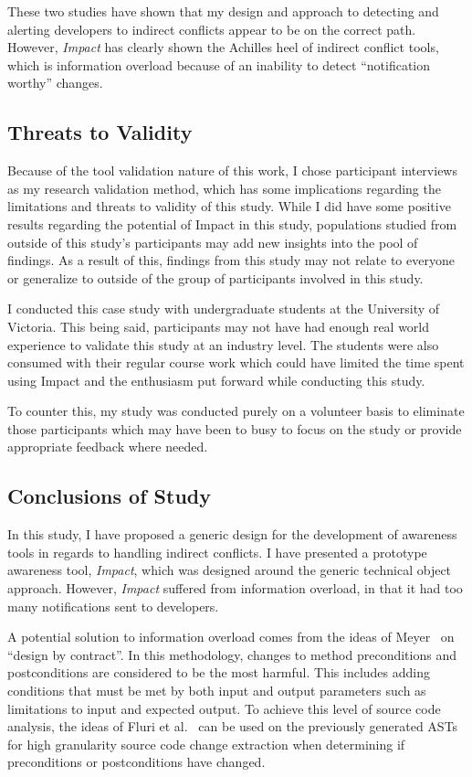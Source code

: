 These two studies have shown that my design and approach to
detecting and alerting developers to indirect conflicts appear
to be on the correct path. However, \textit{Impact} has clearly shown
the Achilles heel of indirect conflict tools, which is information
overload because of an inability to detect ``notification worthy''
changes.

\subsection{Threats to Validity}
Because of the tool validation nature of this work, I chose participant interviews as my research validation method, which has some implications regarding the
limitations and threats to validity of this study. While I did have some positive results regarding the potential of Impact in this study,
populations studied from outside of this study's participants may add new insights into the pool of findings. As a result of this, findings
from this study may not relate to everyone or generalize to outside of the group of participants involved in this study.

I conducted this case study with undergraduate students at the University of Victoria. This being said, participants
may not have had enough real world experience to validate this study at an industry level. The students were also consumed with their regular course
work which could have limited the time spent using Impact and the enthusiasm put forward while conducting this study.

To counter this, my study was conducted purely on a volunteer basis to eliminate those participants which may have been to busy to focus
on the study or provide appropriate feedback where needed.

\subsection{Conclusions of Study}
\label{sec:ns}
In this study, I have proposed a generic 
design for the development of awareness tools in regards to
handling indirect conflicts. I have presented a prototype 
awareness tool, \textit{Impact}, which was designed around the generic 
technical object approach. However, \textit{Impact} suffered from
information overload, in that it had too many notifications sent to
developers.

A potential solution to information overload comes from the ideas of
Meyer~\cite{Meyer:1988} on ``design by contract''. In this methodology, changes to method
preconditions and postconditions are considered to be the most harmful. 
This includes adding conditions that must be met by both input
and output parameters such as limitations to input and expected
output. To achieve this level of source code analysis, the ideas of
Fluri et al.~\cite{Fluri:2007:CDT} can be used on the previously generated
ASTs for high granularity
source code change extraction when determining if preconditions or
postconditions have changed.

